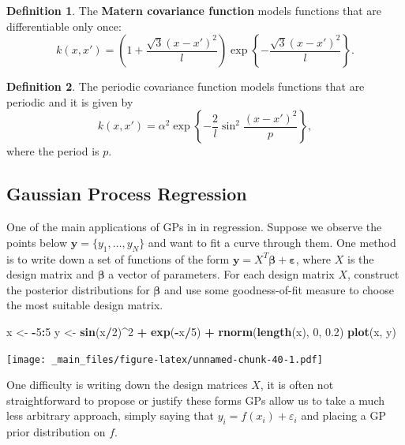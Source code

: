 \documentclass[
]{book}
\newenvironment{Shaded}{\begin{snugshade}}{\end{snugshade}}
\newcommand{\DecValTok}[1]{\textcolor[rgb]{0.00,0.00,0.81}{#1}}
\newcommand{\FloatTok}[1]{\textcolor[rgb]{0.00,0.00,0.81}{#1}}
\newcommand{\FunctionTok}[1]{\textcolor[rgb]{0.13,0.29,0.53}{\textbf{#1}}}
\newcommand{\NormalTok}[1]{#1}
\newcommand{\OtherTok}[1]{\textcolor[rgb]{0.56,0.35,0.01}{#1}}
\newcommand{\SpecialCharTok}[1]{\textcolor[rgb]{0.81,0.36,0.00}{\textbf{#1}}}
\theoremstyle{definition}
\newtheorem{definition}{Definition}[chapter]
\theoremstyle{definition}
\theoremstyle{definition}
\theoremstyle{definition}
\theoremstyle{remark}
\begin{document}
\begin{definition}
The \textbf{M\textquotesingle atern covariance function} models functions that are differentiable only once:
\[
k(x, x') = \left(1 + \frac{\sqrt{3}(x - x')^2}{l} \right)\exp\left\{-\frac{\sqrt{3}(x - x')^2}{l} \right\}.
\]
\end{definition}

\begin{definition}
The periodic covariance function models functions that are periodic and it is given by
\[
k(x, x') = \alpha^2 \exp\left\{-\frac{2}{l}\sin^2\frac{(x-x')^2}{p} \right\},
\]
where the period is \(p\).
\end{definition}

\hypertarget{gaussian-process-regression}{%
\subsection{Gaussian Process Regression}\label{gaussian-process-regression}}

One of the main applications of GPs in in regression. Suppose we observe the points below \(\boldsymbol{y} = \{y_1, \ldots, y_N\}\) and want to fit a curve through them. One method is to write down a set of functions of the form \(\boldsymbol{y} = X^T\boldsymbol{\beta} + \boldsymbol{\varepsilon}\), where \(X\) is the design matrix and \(\boldsymbol{\beta}\) a vector of parameters. For each design matrix \(X\), construct the posterior distributions for \(\boldsymbol{\beta}\) and use some goodness-of-fit measure to choose the most suitable design matrix.

\begin{Shaded}
\begin{Highlighting}[]
\NormalTok{x }\OtherTok{\textless{}{-}} \SpecialCharTok{{-}}\DecValTok{5}\SpecialCharTok{:}\DecValTok{5}
\NormalTok{y }\OtherTok{\textless{}{-}} \FunctionTok{sin}\NormalTok{(x}\SpecialCharTok{/}\DecValTok{2}\NormalTok{)}\SpecialCharTok{\^{}}\DecValTok{2} \SpecialCharTok{+} \FunctionTok{exp}\NormalTok{(}\SpecialCharTok{{-}}\NormalTok{x}\SpecialCharTok{/}\DecValTok{5}\NormalTok{) }\SpecialCharTok{+} \FunctionTok{rnorm}\NormalTok{(}\FunctionTok{length}\NormalTok{(x), }\DecValTok{0}\NormalTok{, }\FloatTok{0.2}\NormalTok{)}
\FunctionTok{plot}\NormalTok{(x, y)}
\end{Highlighting}
\end{Shaded}

\texttt{[image: \_main\_files/figure-latex/unnamed-chunk-40-1.pdf]}

One difficulty is writing down the design matrices \(X\), it is often not straightforward to propose or justify these forms GPs allow us to take a much less arbitrary approach, simply saying that \(y_i = f(x_i) + \varepsilon_i\) and placing a GP prior distribution on \(f\).
\end{document}
